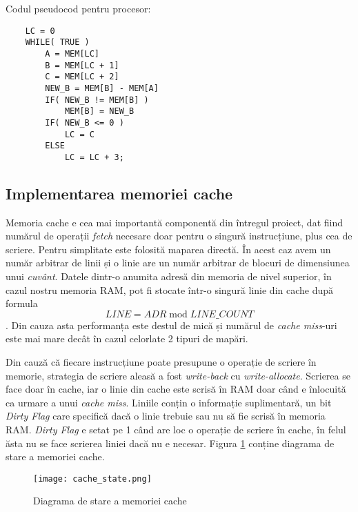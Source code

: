\documentclass[../main.tex]{subfiles}
\begin{document}
\noindent\begin{minipage}{\linewidth}
Codul pseudocod pentru procesor:
\begin{lstlisting}
    LC = 0
    WHILE( TRUE )
        A = MEM[LC]
        B = MEM[LC + 1]
        C = MEM[LC + 2]
        NEW_B = MEM[B] - MEM[A]
        IF( NEW_B != MEM[B] )
            MEM[B] = NEW_B
        IF( NEW_B <= 0 )
            LC = C
        ELSE
            LC = LC + 3;
\end{lstlisting}
\end{minipage}

\subsection{Implementarea memoriei cache}
Memoria cache e cea mai importantă componentă din întregul proiect, dat fiind numărul de operații \emph{fetch} necesare
doar pentru o singură instrucțiune, plus cea de scriere. Pentru simplitate este folosită maparea directă. În acest caz
avem un număr arbitrar de linii și o linie are un număr arbitrar de blocuri de dimensiunea unui \emph{cuvânt}.
Datele dintr-o anumita adresă din memoria de nivel superior, în cazul nostru memoria RAM, pot fi stocate într-o singură
linie din cache după formula $$LINE = ADR \;\mathrm{mod}\; LINE\_COUNT$$. Din cauza asta performanța este destul de mică și numărul
de \emph{cache miss}-uri este mai mare decât în cazul celorlate 2 tipuri de mapări.

Din cauză că fiecare instrucțiune poate presupune o operație de scriere în memorie, strategia de scriere aleasă a fost
\emph{write-back} cu \emph{write-allocate}. Scrierea se face doar în cache, iar o linie din cache este scrisă în RAM
doar când e înlocuită ca urmare a unui \emph{cache miss}. Liniile conțin o informație suplimentară, un bit \emph{Dirty Flag}
care specifică dacă o linie trebuie sau nu să fie scrisă în memoria RAM. \emph{Dirty Flag} e setat pe 1 când are loc o
operație de scriere în cache, în felul ăsta nu se face scrierea liniei dacă nu e necesar. Figura \ref{fig:cache_state}
conține diagrama de stare a memoriei cache.

\begin{figure}[h]
    \centering
    \texttt{[image: cache\_state.png]}
    \caption{Diagrama de stare a memoriei cache}
    \label{fig:cache_state}
\end{figure}
\end{document}
